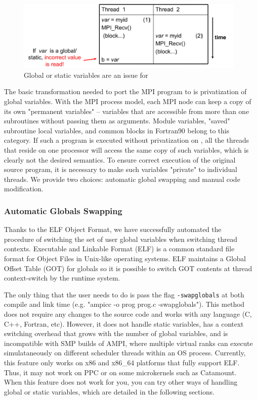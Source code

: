 \documentclass[10pt]{article}
\begin{document}
\begin{figure}[h]
\centering
\includegraphics[width=4.6in]{figs/global.png}
\caption{Global or static variables are an issue for \ampi{}}
\label{fig_global}
\end{figure}

The basic transformation needed to port the MPI program to \ampi{} is
privatization of global variables.
With the MPI process model, each MPI node can keep a copy of its own
"permanent variables" -- variables that are accessible from more than one
subroutines without passing them as arguments.  Module variables, "saved"
subroutine local variables, and common blocks in Fortran90 belong to this
category. If such a program is executed without privatization on \ampi{}, all
the \ampi{} threads that reside on one processor will access the same copy of
such variables, which is clearly not the desired semantics.  To ensure correct
execution of the original source program, it is necessary to make such
variables "private" to individual threads. We provide two choices: automatic 
global swapping and manual code modification.

\subsubsection{Automatic Globals Swapping}
Thanks to the ELF Object Format, we have successfully automated the procedure 
of switching the set of user global variables when switching thread contexts.
Executable and Linkable Format (ELF) is a common standard file format 
for Object Files in Unix-like operating systems.
ELF maintains a Global Offset Table (GOT) for globals so it is possible to
switch GOT contents at thread context-switch by the runtime system.


The only thing that the user needs to do is pass the flag {\tt -swapglobals}
at both compile and link time (e.g. "ampicc -o prog prog.c -swapglobals"). This method does not require
any changes to the source code and works with any language (C, C++, Fortran, etc).
However, it does not handle static variables, has a context switching
overhead that grows with the number of global variables, and is incompatible with SMP builds
of AMPI, where multiple virtual ranks can execute simulataneously on different scheduler threads
within an OS process.
Currently, this feature only works on x86 and x86\_64 
platforms that fully support ELF. Thus, it may not work on PPC or on some microkernels such as Catamount. When this feature does 
not work for you, you can try other ways of handling global or static variables, 
which are detailed in the following sections.
\end{document}
